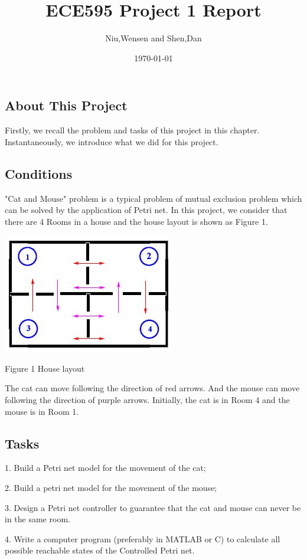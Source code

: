 \documentclass[11pt]{article}
\begin{document}
\tableofcontents

\title{ECE595 Project 1 Report}
\author{Niu,Wensen and Shen,Dan}
\date{\today}
\maketitle
\begin{flushleft}
\section{About This Project}
	Firstly, we recall the problem and tasks of this project in this chapter. Instantaneously, we introduce what we did for this project.
	\subsection{Conditions}
	"Cat and Mouse" problem is a typical problem of mutual exclusion problem which can be solved by the application of Petri net. In this project, we consider that there are 4 Rooms in a house and the house layout is shown as Figure 1.
	\begin{center}
	\includegraphics[]{houselayout.JPG}
	
	Figure 1 House layout
	\end{center}
	The cat can move following the direction of red arrows. And the mouse can move following the direction of purple arrows. Initially, the cat is in Room 4 and the mouse is in Room 1.
	
	\subsection{Tasks}
	1. Build a Petri net model for the movement of the cat;
	
	2. Build a petri net model for the movement of the mouse;
	
	3. Design a Petri net controller to guarantee that the cat and mouse can never be in the same room.
	
	4. Write a computer program (preferably in MATLAB or C) to calculate all possible reachable states of the Controlled Petri net.
		

\end{flushleft}
\end{document}
